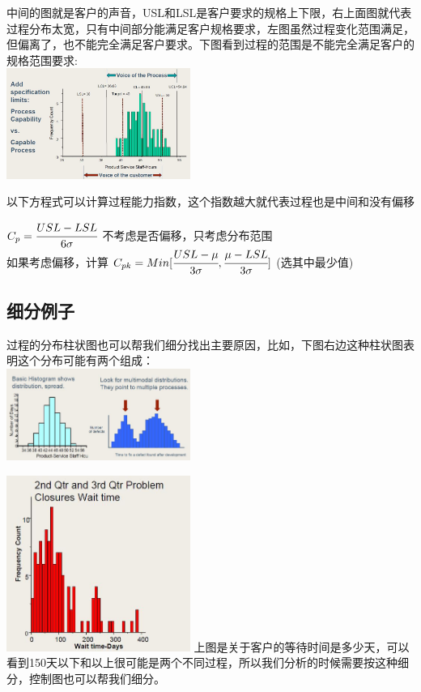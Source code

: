 中间的图就是客户的声音，USL和LSL是客户要求的规格上下限，右上面图就代表过程分布太宽，只有中间部分能满足客户规格要求，左图虽然过程变化范围满足，但偏离了，也不能完全满足客户要求。下图看到过程的范围是不能完全满足客户的规格范围要求:\\

\includegraphics[width=6cm]{DAD_p57.jpg}

以下方程式可以计算过程能力指数，这个指数越大就代表过程也是中间和没有偏移




\(C_p = \cfrac{USL - LSL}{6 \sigma}\) 不考虑是否偏移，只考虑分布范围\\
如果考虑偏移，计算
\(C_{pk} = Min [ \cfrac{USL - \mu}{3 \sigma} , \cfrac{\mu - LSL}{3 \sigma} ]\)
(选其中最少值)\\

\hypertarget{ux7ec6ux5206ux4f8bux5b50}{%
\subsection{细分例子}\label{ux7ec6ux5206ux4f8bux5b50}}

过程的分布柱状图也可以帮我们细分找出主要原因，比如，下图右边这种柱状图表明这个分布可能有两个组成：\\

\includegraphics[width=6cm]{DAD_p55.jpg}


\includegraphics[width=6cm]{DAD_p591.jpg}
上图是关于客户的等待时间是多少天，可以看到150天以下和以上很可能是两个不同过程，所以我们分析的时候需要按这种细分，控制图也可以帮我们细分。

